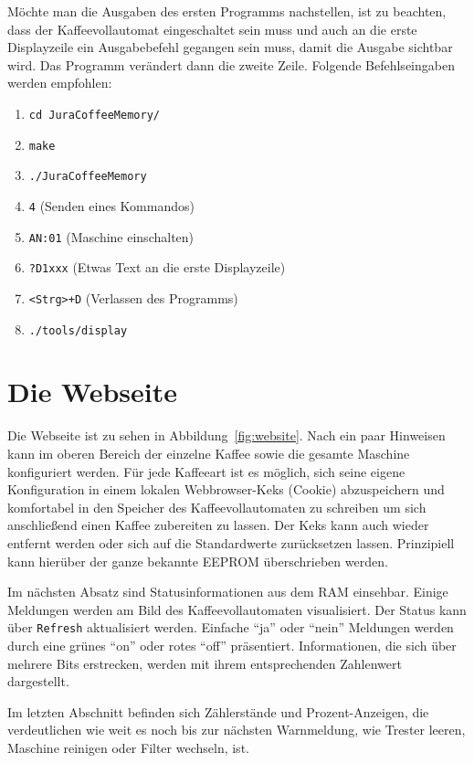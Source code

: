 Möchte man die Ausgaben des ersten Programms nachstellen, ist zu beachten, dass der Kaffeevollautomat eingeschaltet sein muss und auch an die erste Displayzeile ein Ausgabebefehl gegangen sein muss, damit die Ausgabe sichtbar wird.
Das Programm verändert dann die zweite Zeile.
Folgende Befehlseingaben werden empfohlen:
\begin{enumerate}
  \item \texttt{cd JuraCoffeeMemory/}
  \item \texttt{make}
  \item \texttt{./JuraCoffeeMemory}
  \item \texttt{4} (Senden eines Kommandos)
  \item \texttt{AN:01} (Maschine einschalten)
  \item \texttt{?D1xxx} (Etwas Text an die erste Displayzeile)
  \item \texttt{<Strg>+D} (Verlassen des Programms)
  \item \texttt{./tools/display}
\end{enumerate}

\section{Die Webseite}

Die Webseite ist zu sehen in Abbildung~\ref{fig:website}.
Nach ein paar Hinweisen kann im oberen Bereich der einzelne Kaffee sowie die gesamte Maschine konfiguriert werden.
Für jede Kaffeeart ist es möglich, sich seine eigene Konfiguration in einem lokalen Webbrowser-Keks (Cookie) abzuspeichern und komfortabel in den Speicher des Kaffeevollautomaten zu schreiben um sich anschließend einen Kaffee zubereiten zu lassen.
Der Keks kann auch wieder entfernt werden oder sich auf die Standardwerte zurücksetzen lassen.
Prinzipiell kann hierüber der ganze bekannte \ac{EEPROM} überschrieben werden.

Im nächsten Absatz sind Statusinformationen aus dem \ac{RAM} einsehbar.
Einige Meldungen werden am Bild des Kaffeevollautomaten visualisiert.
Der Status kann über \texttt{Refresh} aktualisiert werden.
Einfache "`ja"' oder "`nein"' Meldungen werden durch eine grünes "`on"' oder rotes "`off"' präsentiert.
Informationen, die sich über mehrere Bits erstrecken, werden mit ihrem entsprechenden Zahlenwert dargestellt.

Im letzten Abschnitt befinden sich Zählerstände und Prozent-Anzeigen, die verdeutlichen wie weit es noch bis zur nächsten Warnmeldung, wie Trester leeren, Maschine reinigen oder Filter wechseln, ist.

